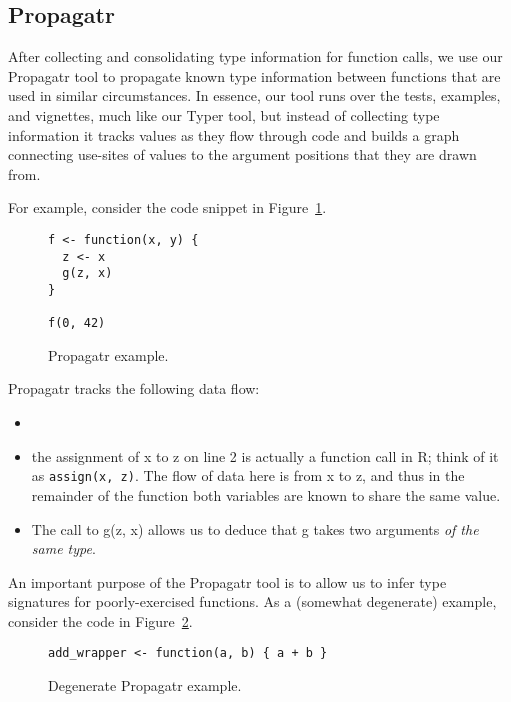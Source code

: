 \documentclass[sigplan,10pt,review,anonymous]{acmart}\settopmatter{printfolios=true,printccs=false,printacmref=false}
\begin{document}
%
%
%
%
\subsection{Propagatr}

After collecting and consolidating type information for function calls, we use our Propagatr tool to propagate known type information between functions that are used in similar circumstances.
In essence, our tool runs over the tests, examples, and vignettes, much like our Typer tool, but instead of collecting type information it tracks values as they flow through code and builds a graph connecting use-sites of values to the argument positions that they are drawn from.

For example, consider the code snippet in Figure~\ref{fig:propagatr-example}.

\begin{figure}[!hb]{\small\begin{lstlisting}[style=R]
f <- function(x, y) {
  z <- x
  g(z, x)
}

f(0, 42)
\end{lstlisting}}\caption{Propagatr example.}\label{fig:propagatr-example}\end{figure}

Propagatr tracks the following data flow:

\begin{itemize}
\item {}
\item the assignment of x to z on line 2 is actually a function call in R; think of it as {\tt assign(x, z)}.
The flow of data here is from x to z, and thus in the remainder of the function both variables are known to share the same value.
\item The call to g(z, x) allows us to deduce that g takes two arguments {\it of the same type}. 
\end{itemize}

An important purpose of the Propagatr tool is to allow us to infer type signatures for poorly-exercised functions.
As a (somewhat degenerate) example, consider the code in Figure~\ref{fig:propagatr-degenerate}.

\begin{figure}[!hb]{\small\begin{lstlisting}[style=R]
add_wrapper <- function(a, b) { a + b }
\end{lstlisting}}\caption{Degenerate Propagatr example.}\label{fig:propagatr-degenerate}\end{figure}
\end{document}
